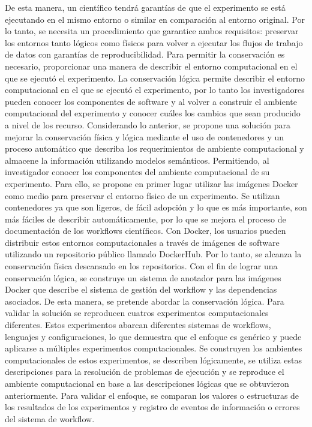 De esta manera, un científico tendrá garantías de que el experimento se está ejecutando en el mismo entorno o similar en comparación al entorno original.
Por lo tanto, se necesita un procedimiento que garantice ambos requisitos: preservar los entornos tanto lógicos como físicos para volver a ejecutar los flujos de trabajo de datos con garantías de reproducibilidad.
Para permitir la conservación es necesario, proporcionar una manera de describir el entorno computacional en el que se ejecutó el experimento. 
La conservación lógica permite describir el entorno computacional en el que se ejecutó el experimento, por lo tanto los investigadores pueden conocer los componentes de software y al volver a construir el ambiente computacional del experimento y conocer cuáles los cambios que sean producido a nivel de los recurso.
Considerando lo anterior, se propone una solución para mejorar la conservación física y lógica mediante el uso de contenedores y un proceso automático que describa los requerimientos de ambiente computacional y almacene la información utilizando modelos semánticos. Permitiendo, al investigador conocer los componentes del ambiente computacional de su experimento.
Para ello, se propone en primer lugar utilizar las imágenes Docker como medio para preservar el entorno físico de un experimento. Se utilizan contenedores ya que son ligeros, de fácil adopción y lo que es más importante, son más fáciles de describir automáticamente, por lo que se mejora el proceso de documentación de los workflows científicos.
Con Docker, los usuarios pueden distribuir estos entornos computacionales a través de imágenes de software utilizando un repositorio público llamado DockerHub. Por lo tanto, se alcanza la conservación física descansado en los repositorios.
Con el fin de lograr una conservación lógica, se construye un sistema de anotador para las imágenes Docker que describe el sistema de gestión del workflow y las dependencias asociados. De esta manera, se pretende abordar la conservación lógica.
Para validar la solución se reproducen cuatros experimentos computacionales diferentes. Estos experimentos abarcan diferentes sistemas de workflows, lenguajes y configuraciones, lo que demuestra que el enfoque es genérico y puede aplicarse a múltiples experimentos computacionales.
Se construyen los ambientes computacionales de estos experimentos, se describen lógicamente, se utiliza estas descripciones para la resolución de problemas de ejecución y se reproduce el ambiente computacional en base a las descripciones lógicas que se obtuvieron anteriormente.
Para validar el enfoque, se comparan los valores o estructuras de los resultados de los experimentos y registro de eventos de información o errores del sistema de workflow.